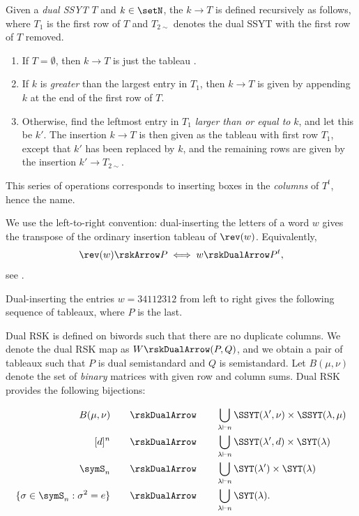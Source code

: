 Given a \emph{dual SSYT} $T$ and $k \in \setN$, the
\label{dualInsertion}
$k \to T$ is defined recursively as follows, where $T_1$ is the first
row of $T$ and $T_{2\sim}$ denotes the dual SSYT with the first row of $T$
removed.
\begin{enumerate}
\item If $T = \emptyset$, then $k \to T$ is just the tableau .
\item If $k$ is \emph{greater} than the largest entry in $T_1$,
then $k \to T$ is given by appending $k$ at the end of the first row of $T$.
\item Otherwise, find the leftmost entry in $T_1$ \emph{larger than or equal to} $k$,
and let this be $k'$.
The insertion $k \to T$ is then given as the tableau with first row $T_1$,
except that $k'$ has been replaced by $k$, and the remaining rows are given by
the insertion $k' \to T_{2\sim}$.
\end{enumerate}
This series of operations corresponds to inserting boxes in the \emph{columns} of $T^t$,
hence the name.

We use the left-to-right convention: dual-inserting the letters of a word $w$
gives the transpose of the ordinary insertion tableau of $\rev(w)$.
Equivalently,
\[
\rev(w) \rskArrow P \iff w \rskDualArrow P^t,
\]
see \cite[Prop.~2.3.14]{Butler1994}.

\begin{example}
Dual-inserting the entries $w=34112312$ from left to right
gives the following sequence of tableaux, where $P$ is the last.

\begin{figure}
\end{figure}

\end{example}

Dual RSK is defined on biwords such that there are no duplicate columns.
We denote the dual RSK map as $W \rskDualArrow (P,Q)$,
and we obtain a pair of tableaux such that $P$ is dual semistandard and $Q$ is semistandard.
Let $B(\mu,\nu)$ denote the set of \emph{binary} matrices with given row and column sums.
Dual RSK provides the following bijections:

\begin{align}
B(\mu,\nu) & \qquad \rskDualArrow \qquad \bigcup_{\lambda \vdash n} \SSYT(\lambda',\nu) \times \SSYT(\lambda,\mu) \\
[d]^n & \qquad \rskDualArrow \qquad \bigcup_{\lambda \vdash n} \SSYT(\lambda',d) \times \SYT(\lambda) \\
\symS_n  & \qquad\rskDualArrow \qquad \bigcup_{\lambda \vdash n} \SYT(\lambda') \times \SYT(\lambda) \\
\{\sigma \in \symS_n : \sigma^2 = e \}  & \qquad \rskDualArrow \qquad \bigcup_{\lambda \vdash n} \SYT(\lambda).
\end{align}

